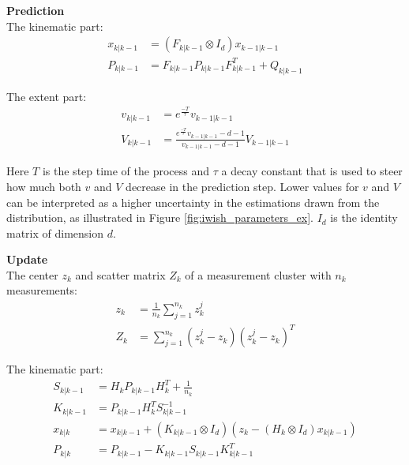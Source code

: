 \textbf{Prediction} \\
The kinematic part:
\begin{equation}
\begin{split}
    x_{k|k-1} &= (F_{k|k-1} \otimes I_d)x_{k-1|k-1}\\
    P_{k|k-1} &= F_{k|k-1}P_{k|k-1}F_{k|k-1}^T + Q_{k|k-1}
\end{split}
\label{eq:ellip_prediction_kin}
\end{equation}

The extent part:
\begin{equation}
\begin{split}
    v_{k|k-1} &= e^{\frac{-T}{\tau}} v_{k-1|k-1}\\
    V_{k|k-1} &= \frac{e^{\frac{-T}{\tau}}v_{k-1|k-1}-d-1}{v_{k-1|k-1}-d-1}V_{k-1|k-1}
\end{split}
\label{eq:ellip_prediction_ext}
\end{equation}

Here $T$ is the step time of the process and $\tau$ a decay constant that is used to steer how much both $v$ and $V$ decrease in the prediction step. Lower values for $v$ and $V$ can be interpreted as a higher uncertainty in the estimations drawn from the distribution, as illustrated in Figure \ref{fig:iwish_parameters_ex}. $I_d$ is the identity matrix of dimension $d$.

\textbf{Update} \\
The center $z_k$ and scatter matrix $Z_k$ of a measurement cluster with $n_k$ measurements:
\begin{equation}
\begin{split}
    z_k &= \frac{1}{n_k}\sum\limits_{j=1}^{n_k} z_k^j \\
    Z_k &= \sum\limits_{j=1}^{n_k}(z_k^j - z_k)(z_k^j - z_k)^T
\end{split}
\label{eq:ellip_meas_init}
\end{equation}

The kinematic part:
\begin{equation}
\begin{split}
    S_{k|k-1} &= H_kP_{k|k-1}H_k^T + \frac{1}{n_k} \\
    K_{k|k-1} &= P_{k|k-1}H_k^TS_{k|k-1}^{-1} \\
    x_{k|k} &= x_{k|k-1} + (K_{k|k-1} \otimes I_d) (z_k - (H_k \otimes I_d) x_{k|k-1})\\
    P_{k|k} &= P_{k|k-1} - K_{k|k-1}S_{k|k-1}K_{k|k-1}^T
\end{split}
\label{eq:ellip_update_kin}
\end{equation}

